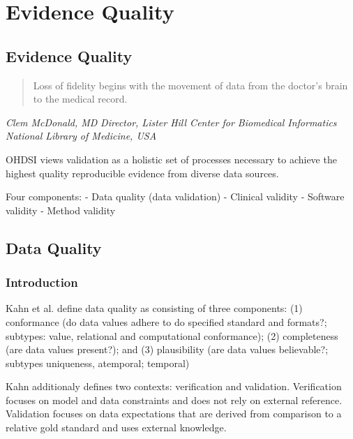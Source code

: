 \documentclass[]{book}
\begin{document}
\part{Evidence Quality}\label{part-evidence-quality}

\chapter{Evidence Quality}\label{EvidenceQuality}

\begin{quote}
Loss of fidelity begins with the movement of data from the doctor's
brain to the medical record.
\end{quote}

\emph{Clem McDonald, MD} \emph{Director, Lister Hill Center for
Biomedical Informatics} \emph{National Library of Medicine, USA}

OHDSI views validation as a holistic set of processes necessary to
achieve the highest quality reproducible evidence from diverse data
sources.

Four components: - Data quality (data validation) - Clinical validity -
Software validity - Method validity

\chapter{Data Quality}\label{DataQuality}

\section{Introduction}\label{introduction}

Kahn et al. define data quality as consisting of three components: (1)
conformance (do data values adhere to do specified standard and
formats?; subtypes: value, relational and computational conformance);
(2) completeness (are data values present?); and (3) plausibility (are
data values believable?; subtypes uniqueness, atemporal; temporal)
\citep{kahn_harmonized_2016}

Kahn additionaly defines two contexts: verification and validation.
Verification focuses on model and data constraints and does not rely on
external reference. Validation focuses on data expectations that are
derived from comparison to a relative gold standard and uses external
knowledge.
\end{document}
